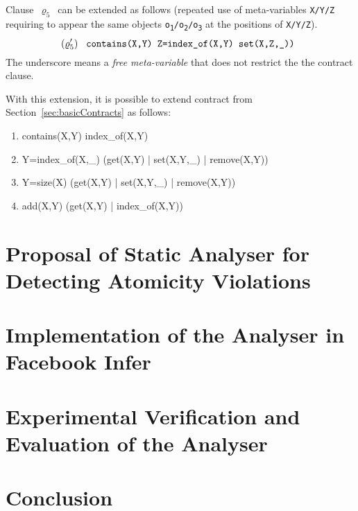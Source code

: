 Clause~$ \varrho_5 $~can be extended as follows (repeated use of
meta-variables \texttt{X/Y/Z} requiring to appear the same objects
\texttt{o\textsubscript{1}/o\textsubscript{2}/o\textsubscript{3}} at the
positions of \texttt{X/Y/Z}).
$$
    (\varrho^\prime_5)\ \text{\texttt{
        contains(X,Y) Z=index\_of(X,Y) set(X,Z,\_))
    }}
$$
The underscore means a \emph{free meta-variable} that does not restrict
the the contract clause.

With this extension, it is possible to extend contract from
Section~\ref{sec:basicContracts} as follows:
\begin{enumerate}[label={$ (\varrho^\prime_{\arabic*}) $}]
    \tt

    \item contains(X,Y) index\_of(X,Y)
    \item Y=index\_of(X,\_) (get(X,Y) | set(X,Y,\_) | remove(X,Y))
    \item Y=size(X) (get(X,Y) | set(X,Y,\_) | remove(X,Y))
    \item add(X,Y) (get(X,Y) | index\_of(X,Y))
\end{enumerate}



\chapter{Proposal of Static Analyser for Detecting Atomicity Violations}
\label{chap:proposal}



\chapter{Implementation of the Analyser in Facebook Infer}
\label{chap:implementation}



\chapter{Experimental Verification and Evaluation of the Analyser}
\label{chap:experiments}



\chapter{Conclusion}
\label{chap:conclusion}


